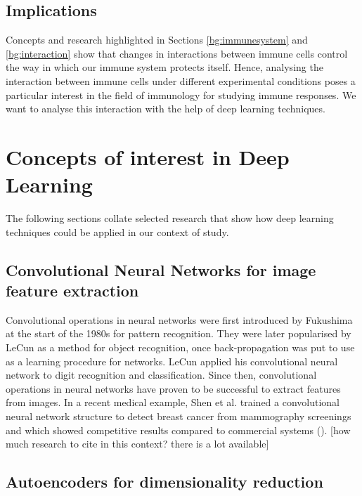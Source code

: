 \subsection{Implications}

Concepts and research highlighted in Sections \ref{bg:immunesystem} and \ref{bg:interaction} show that changes in interactions between immune cells control the way in which our immune system protects itself. Hence, analysing the interaction between immune cells under different experimental conditions poses a particular interest in the field of immunology for studying immune responses. We want to analyse this interaction with the help of deep learning techniques. 

\section{Concepts of interest in Deep Learning}

The following sections collate selected research that show how deep learning techniques could be applied in our context of study. 

\subsection{Convolutional Neural Networks for image feature extraction}

Convolutional operations in neural networks were first introduced by Fukushima at the start of the 1980s for pattern recognition. They were later popularised by LeCun as a method for object recognition, once back-propagation was put to use as a learning procedure for networks. LeCun applied his convolutional neural network to digit recognition and classification. Since then, convolutional operations in neural networks have proven to be successful to extract features from images. In a recent medical example, Shen et al. trained a convolutional neural network structure to detect breast cancer from mammography screenings and which showed competitive results compared to commercial systems (\cite{https://www.nature.com/articles/s41598-019-48995-4}). 
[how much research to cite in this context? there is a lot available]

\subsection{Autoencoders for dimensionality reduction}

